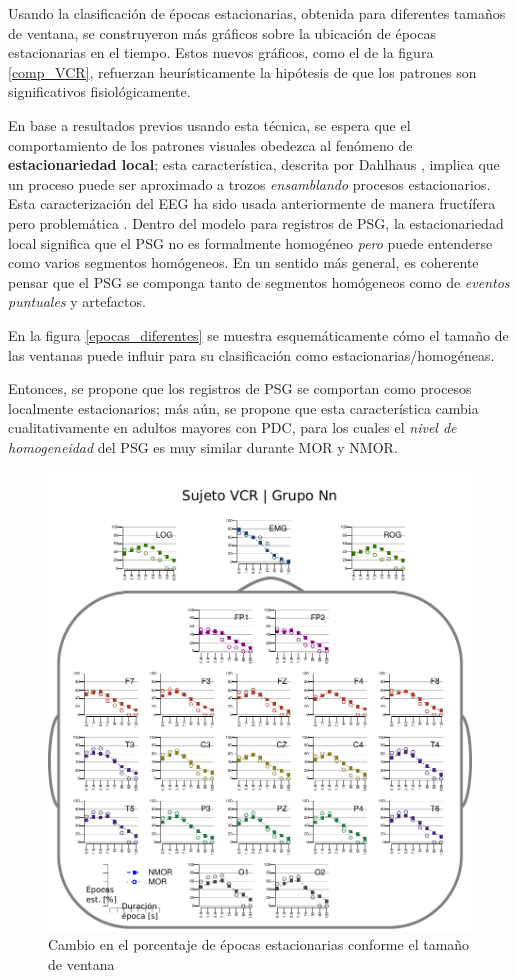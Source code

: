 Usando la clasificación de épocas estacionarias, obtenida para diferentes tamaños de ventana, se 
construyeron más gráficos sobre la ubicación de épocas estacionarias en el tiempo. Estos nuevos
gráficos, como el de la figura \ref{comp_VCR}, refuerzan heurísticamente la hipótesis de que los 
patrones son significativos fisiológicamente. 

En base a resultados previos usando esta técnica, se espera que el comportamiento de los patrones 
visuales obedezca al fenómeno de \textbf{estacionariedad local}; esta característica, descrita por 
Dahlhaus \cite{Dahlhaus97}, implica que un proceso puede ser aproximado a trozos 
\textit{ensamblando} procesos estacionarios.
%
Esta caracterización del EEG ha sido usada anteriormente de manera fructífera pero problemática
\cite{Barlow85,Kaplan99}.
%
Dentro del modelo para registros de PSG, la estacionariedad local significa que el PSG no es
formalmente homogéneo \textit{pero} puede entenderse como varios segmentos homógeneos. En un
sentido más general, es coherente pensar que el PSG se componga tanto de segmentos homógeneos
como de \textit{eventos puntuales} y artefactos.

En la figura \ref{epocas_diferentes} se muestra esquemáticamente cómo el tamaño
de las ventanas puede influir para su clasificación como estacionarias/homogéneas.

Entonces, se propone que los registros de PSG se comportan como procesos localmente estacionarios; 
más aún, se propone que esta característica cambia cualitativamente en adultos mayores con PDC,
para los cuales el \textit{nivel de homogeneidad} del PSG es muy similar durante MOR y NMOR.

\begin{figure}
\centering
\includegraphics[width=.9\linewidth]{./img_resultados/cabeza_VCR.pdf}
\caption{Cambio en el porcentaje de épocas estacionarias conforme el tamaño de ventana}
\label{cabeza_repoio}
\end{figure}

